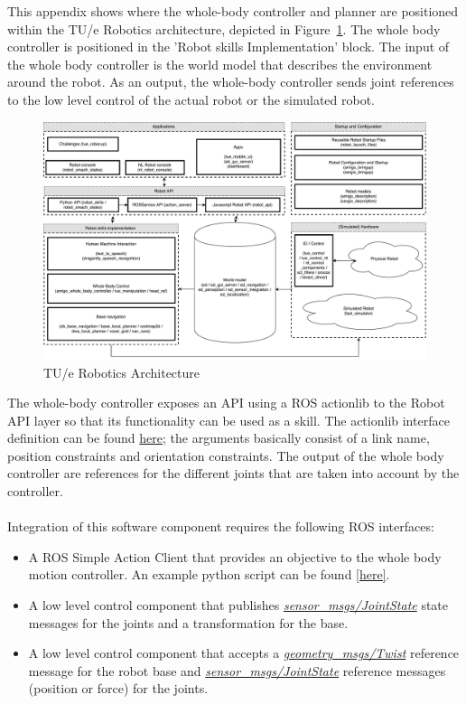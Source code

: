 This appendix shows where the whole-body controller and planner are positioned within the TU/e Robotics architecture, depicted in Figure~\ref{app:architecture}. The whole body controller is positioned in the 'Robot skills Implementation' block. The input of the whole body controller is the world model that describes the environment around the robot. As an output, the whole-body controller sends joint references to the low level control of the actual robot or the simulated robot.
\begin{figure}[H]
    \centering
    \includegraphics[width = 1.0\linewidth]{pics/architecture.pdf}
    \caption{TU/e Robotics Architecture}
    \label{app:architecture}
\end{figure}
The whole-body controller exposes an API using a ROS actionlib to the Robot API layer so that its functionality can be used as a skill. The actionlib interface definition can be found \href{https://github.com/tue-robotics/amigo_whole_body_controller/blob/master/action/ArmTask.action}{here}; the arguments basically consist of a link name, position constraints and orientation constraints. The output of the whole body controller	are references for the different joints that are taken into account by the controller.
\\\\
Integration of this software component requires the following ROS interfaces:
\begin{itemize}
	\item A ROS Simple Action Client that provides an objective to the whole body motion controller. An example python script can be found \href{https://github.com/tue-robotics/amigo_whole_body_controller/blob/5d8482e3111d55bb1d6b5f6e4708e6a8f5dce03a/scripts/cartesionmotionobjective.py}{[here]}.
	\item A low level control component that publishes \href{http://docs.ros.org/api/sensor_msgs/html/msg/JointState.html}{\textit{sensor\_msgs/JointState}} state messages for the joints and a transformation for the base.
	\item A low level control component that accepts a \href{http://docs.ros.org/api/geometry_msgs/html/msg/Twist.html}{\textit{geometry\_msgs/Twist}} reference message for the robot base and \href{http://docs.ros.org/api/sensor_msgs/html/msg/JointState.html}{\textit{sensor\_msgs/JointState}} reference messages (position or force) for the joints.
\end{itemize}
